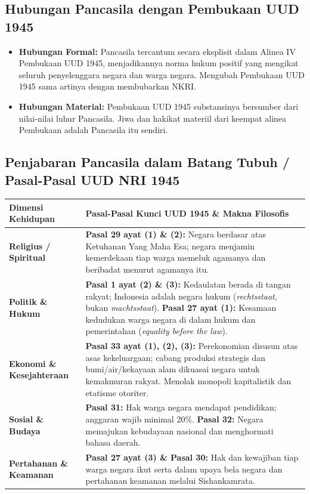 \documentclass[10pt,a4paper]{article}
\begin{document}
\subsection{Hubungan Pancasila dengan Pembukaan UUD 1945}
\begin{itemize}
  \item \textbf{Hubungan Formal:} Pancasila tercantum secara eksplisit dalam Alinea IV Pembukaan UUD 1945, menjadikannya norma hukum positif yang mengikat seluruh penyelenggara negara dan warga negara. Mengubah Pembukaan UUD 1945 sama artinya dengan membubarkan NKRI.
  \item \textbf{Hubungan Material:} Pembukaan UUD 1945 substansinya bersumber dari nilai-nilai luhur Pancasila. Jiwa dan hakikat materiil dari keempat alinea Pembukaan adalah Pancasila itu sendiri.
\end{itemize}

\subsection{Penjabaran Pancasila dalam Batang Tubuh / Pasal-Pasal UUD NRI 1945}
\begin{tabularx}{\linewidth}{lX}
  \toprule
  \textbf{Dimensi Kehidupan} & \textbf{Pasal-Pasal Kunci UUD 1945 \& Makna Filosofis} \\
  \midrule
  \textbf{Religius / Spiritual} & \textbf{Pasal 29 ayat (1) \& (2):} Negara berdasar atas Ketuhanan Yang Maha Esa; negara menjamin kemerdekaan tiap warga memeluk agamanya dan beribadat menurut agamanya itu. \\
  \textbf{Politik \& Hukum} & \textbf{Pasal 1 ayat (2) \& (3):} Kedaulatan berada di tangan rakyat; Indonesia adalah negara hukum (\textit{rechtsstaat}, bukan \textit{machtsstaat}). \textbf{Pasal 27 ayat (1):} Kesamaan kedudukan warga negara di dalam hukum dan pemerintahan (\textit{equality before the law}). \\
  \textbf{Ekonomi \& Kesejahteraan} & \textbf{Pasal 33 ayat (1), (2), (3):} Perekonomian disusun atas asas kekeluargaan; cabang produksi strategis dan bumi/air/kekayaan alam dikuasai negara untuk kemakmuran rakyat. Menolak monopoli kapitalistik dan etatisme otoriter. \\
  \textbf{Sosial \& Budaya} & \textbf{Pasal 31:} Hak warga negara mendapat pendidikan; anggaran wajib minimal 20\%. \textbf{Pasal 32:} Negara memajukan kebudayaan nasional dan menghormati bahasa daerah. \\
  \textbf{Pertahanan \& Keamanan} & \textbf{Pasal 27 ayat (3) \& Pasal 30:} Hak dan kewajiban tiap warga negara ikut serta dalam upaya bela negara dan pertahanan keamanan melalui Sishankamrata. \\
  \bottomrule
\end{tabularx}
\end{document}
